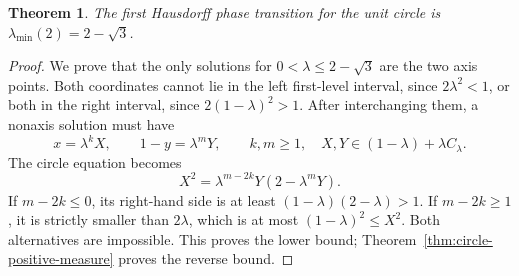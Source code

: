 \documentclass[11pt,a4paper]{amsart}
\numberwithin{equation}{section}
\newtheorem{theorem}{Theorem}[section]
\theoremstyle{definition}
\begin{document}
\begin{theorem}\label{thm:circle-onset}
The first Hausdorff phase transition for the unit circle is
\(\lambda_{\min}(2)=2-\sqrt3\).
\end{theorem}
\begin{proof}
We prove that the only solutions for \(0<\lambda\leq2-\sqrt3\)
are the two axis points. Both coordinates cannot lie in the
left first-level interval, since \(2\lambda^2<1\), or both in
the right interval, since \(2(1-\lambda)^2>1\).
After interchanging them, a nonaxis solution must have
\[
x=\lambda^k X,\qquad 1-y=\lambda^mY,\qquad
k,m\geq1,\quad X,Y\in(1-\lambda)+\lambda C_\lambda.
\]
The circle equation becomes
\[
X^2=\lambda^{m-2k}Y(2-\lambda^mY).
\]
If \(m-2k\leq0\), its right-hand side is at least
\((1-\lambda)(2-\lambda)>1\).
If \(m-2k\geq1\), it is strictly smaller than \(2\lambda\),
which is at most \((1-\lambda)^2\leq X^2\).
Both alternatives are impossible. This proves the lower bound;
Theorem~\ref{thm:circle-positive-measure} proves the reverse bound.
\end{proof}
\end{document}
